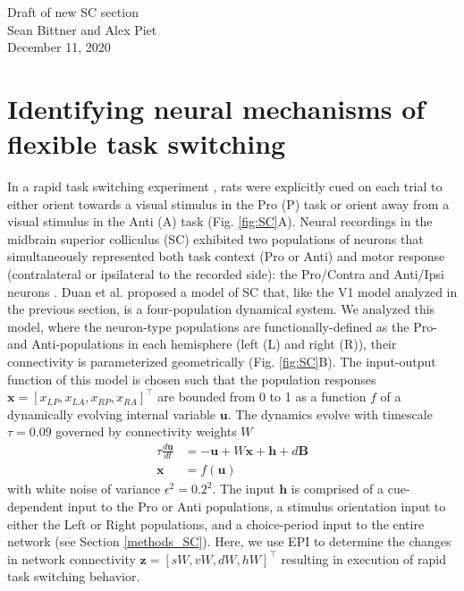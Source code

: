 \documentclass[11pt]{article}
\begin{document}
\medskip                        %

\thispagestyle{plain}
\begin{center}                  %
{\Large Draft of new SC section} \\
Sean Bittner and Alex Piet \\
December 11, 2020 \\
\end{center}

\section{Identifying neural mechanisms of flexible task switching} \label{results_SC}
In a rapid task switching experiment \cite{duan2015requirement}, rats were explicitly cued on each trial to either orient towards a visual stimulus in the Pro (P) task or orient away from a visual stimulus in the Anti (A) task (Fig. \ref{fig:SC}A). 
Neural recordings in the midbrain superior colliculus (SC) exhibited two populations of neurons that simultaneously represented both task context (Pro or Anti) and motor response (contralateral or ipsilateral to the recorded side): the Pro/Contra and Anti/Ipsi neurons \cite{duan2018collicular}.
Duan et al. proposed a model of SC that, like the V1 model analyzed in the previous section, is a four-population dynamical system.  
We analyzed this model, where the neuron-type populations are functionally-defined as the Pro- and Anti-populations in each hemisphere (left (L) and right (R)), their connectivity is parameterized geometrically  (Fig. \ref{fig:SC}B).
The input-output function of this model is chosen such that the population responses $\mathbf{x} = [x_{LP}, x_{LA}, x_{RP}, x_{RA}]^\top$ are bounded from 0 to 1 as a function $f$ of a dynamically evolving internal variable $\mathbf{u}$.
The dynamics evolve with timescale $\tau=0.09$ governed by connectivity weights $W$
\begin{equation}
\begin{split}
\tau \frac{d\mathbf{u}}{dt} &= -\mathbf{u} + W\mathbf{x} + \mathbf{h} + d\mathbf{B} \\
\mathbf{x} &= f(\mathbf{u})
\end{split}
\end{equation}
with white noise of variance $\epsilon^2 = 0.2^2$.
The input $\mathbf{h}$ is comprised of a cue-dependent input to the Pro or Anti populations, a stimulus orientation input to either the Left or Right populations, and a choice-period input to the entire network (see Section \ref{methods_SC}).
Here, we use EPI to determine the changes in network connectivity $\mathbf{z} = [sW, vW, dW, hW]^{\top}$ resulting in execution of rapid task switching behavior.
\end{document}
